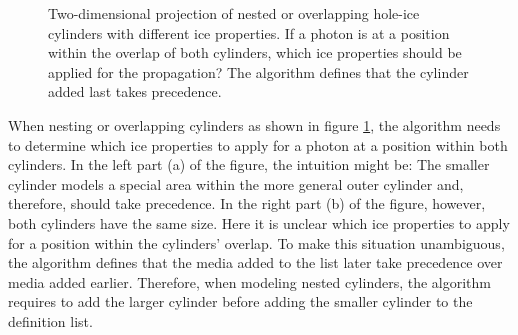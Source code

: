 \begin{figure}[htbp]
  \hfill
  \caption{Two-dimensional projection of nested or overlapping hole-ice cylinders with different ice properties. If a photon is at a position within the overlap of both cylinders, which ice properties should be applied for the propagation? The algorithm defines that the cylinder added last takes precedence.}
  \label{fig:kuZ8deek}
\end{figure}

When nesting or overlapping cylinders as shown in figure \ref{fig:kuZ8deek}, the algorithm needs to determine which ice properties to apply for a photon at a position within both cylinders.
In the left part (a) of the figure, the intuition might be: The smaller cylinder models a special area within the more general outer cylinder and, therefore, should take precedence. In the right part (b) of the figure, however, both cylinders have the same size. Here it is unclear which ice properties to apply for a position within the cylinders' overlap.
To make this situation unambiguous, the algorithm defines that the media added to the list later take precedence over media added earlier. Therefore, when modeling nested cylinders, the algorithm requires to add the larger cylinder before adding the smaller cylinder to the definition list.

